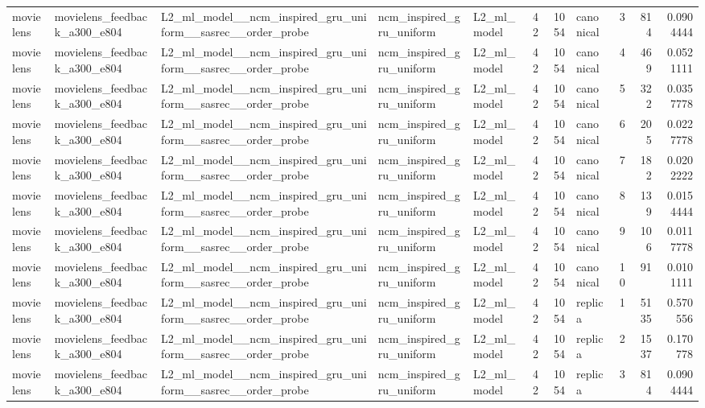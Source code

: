 \begin{table}[htbp!]
\begin{tabular}{lllllrrlrrr}
movielens & movielens\_feedback\_a300\_e804 & L2\_ml\_model\_\_ncm\_inspired\_gru\_uniform\_\_sasrec\_\_order\_probe & ncm\_inspired\_gru\_uniform & L2\_ml\_model & 42 & 1054 & canonical & 3 & 814 & 0.0904444 \\
movielens & movielens\_feedback\_a300\_e804 & L2\_ml\_model\_\_ncm\_inspired\_gru\_uniform\_\_sasrec\_\_order\_probe & ncm\_inspired\_gru\_uniform & L2\_ml\_model & 42 & 1054 & canonical & 4 & 469 & 0.0521111 \\
movielens & movielens\_feedback\_a300\_e804 & L2\_ml\_model\_\_ncm\_inspired\_gru\_uniform\_\_sasrec\_\_order\_probe & ncm\_inspired\_gru\_uniform & L2\_ml\_model & 42 & 1054 & canonical & 5 & 322 & 0.0357778 \\
movielens & movielens\_feedback\_a300\_e804 & L2\_ml\_model\_\_ncm\_inspired\_gru\_uniform\_\_sasrec\_\_order\_probe & ncm\_inspired\_gru\_uniform & L2\_ml\_model & 42 & 1054 & canonical & 6 & 205 & 0.0227778 \\
movielens & movielens\_feedback\_a300\_e804 & L2\_ml\_model\_\_ncm\_inspired\_gru\_uniform\_\_sasrec\_\_order\_probe & ncm\_inspired\_gru\_uniform & L2\_ml\_model & 42 & 1054 & canonical & 7 & 182 & 0.0202222 \\
movielens & movielens\_feedback\_a300\_e804 & L2\_ml\_model\_\_ncm\_inspired\_gru\_uniform\_\_sasrec\_\_order\_probe & ncm\_inspired\_gru\_uniform & L2\_ml\_model & 42 & 1054 & canonical & 8 & 139 & 0.0154444 \\
movielens & movielens\_feedback\_a300\_e804 & L2\_ml\_model\_\_ncm\_inspired\_gru\_uniform\_\_sasrec\_\_order\_probe & ncm\_inspired\_gru\_uniform & L2\_ml\_model & 42 & 1054 & canonical & 9 & 106 & 0.0117778 \\
movielens & movielens\_feedback\_a300\_e804 & L2\_ml\_model\_\_ncm\_inspired\_gru\_uniform\_\_sasrec\_\_order\_probe & ncm\_inspired\_gru\_uniform & L2\_ml\_model & 42 & 1054 & canonical & 10 & 91 & 0.0101111 \\
movielens & movielens\_feedback\_a300\_e804 & L2\_ml\_model\_\_ncm\_inspired\_gru\_uniform\_\_sasrec\_\_order\_probe & ncm\_inspired\_gru\_uniform & L2\_ml\_model & 42 & 1054 & replica & 1 & 5135 & 0.570556 \\
movielens & movielens\_feedback\_a300\_e804 & L2\_ml\_model\_\_ncm\_inspired\_gru\_uniform\_\_sasrec\_\_order\_probe & ncm\_inspired\_gru\_uniform & L2\_ml\_model & 42 & 1054 & replica & 2 & 1537 & 0.170778 \\
movielens & movielens\_feedback\_a300\_e804 & L2\_ml\_model\_\_ncm\_inspired\_gru\_uniform\_\_sasrec\_\_order\_probe & ncm\_inspired\_gru\_uniform & L2\_ml\_model & 42 & 1054 & replica & 3 & 814 & 0.0904444 \\

\end{tabular}
\end{table}
